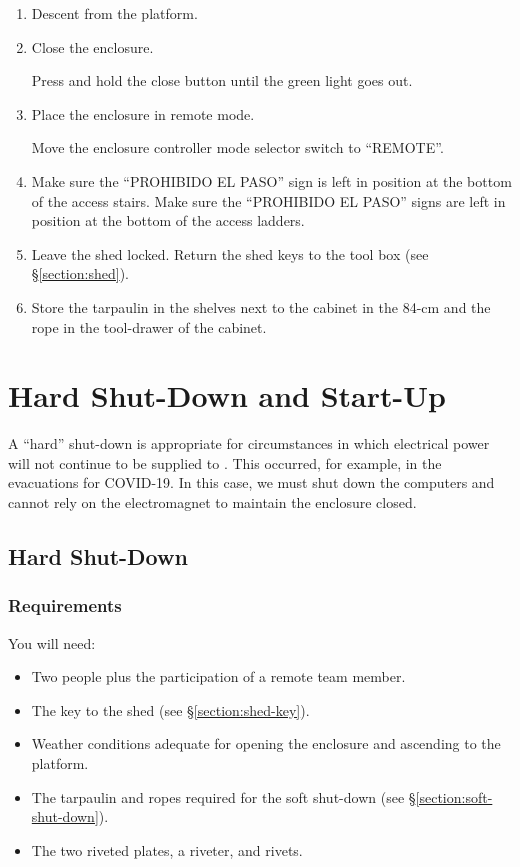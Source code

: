 \begin{enumerate}
\item Descent from the platform.

\item Close the enclosure. 

Press and hold the close button until the green light goes out.

\item
Place the enclosure in remote mode.

Move the enclosure controller mode selector switch to “REMOTE”.

\item
\ifcoatli
Make sure the “PROHIBIDO EL PASO” sign is left in position at the bottom of the access stairs.
\fi
\ifddoti
Make sure the “PROHIBIDO EL PASO” signs are left in position at the bottom of the access ladders.
\fi

\item
Leave the shed locked. Return the shed keys to the tool box (see \S\ref{section:shed}).

\item
Store the tarpaulin in the shelves next to the cabinet in the 84-cm and the rope in the tool-drawer of the cabinet.

\end{enumerate}

\section{Hard Shut-Down and Start-Up}

A “hard” shut-down is appropriate for circumstances in which electrical power will not continue to be supplied to {\projectname}. This occurred, for example, in the evacuations for COVID-19. In this case, we must shut down the computers and cannot rely on the electromagnet to maintain the enclosure closed.

\subsection{Hard Shut-Down}

\subsubsection{Requirements}

You will need:

\begin{itemize}
    \item Two people plus the participation of a remote team member.
    \item The key to the shed (see \S\ref{section:shed-key}).
    \item Weather conditions adequate for opening the enclosure and ascending to the platform.
    \item The tarpaulin and ropes required for the soft shut-down (see \S\ref{section:soft-shut-down}).
    \item The two riveted plates, a riveter, and rivets.
\end{itemize}


